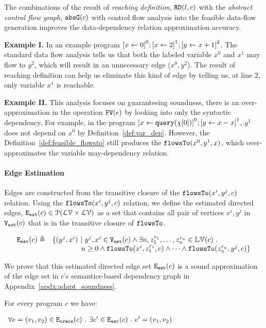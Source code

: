 The combinations of the result of \emph{reaching definition}, $\mathtt{RD}(l, c)$
with the \emph{abstract control flow graph}, $\mathtt{abs}{\mathtt{G}}(c)$ with control flow analysis into the feasible 
data-flow generation improves the data-dependency relation approximation accuracy. 

\textbf{Example I.}
In an example program $\clabel{\assign{x}{0}}^{0}; \clabel{\assign{x}{2}}^{1}; \clabel{\assign{y}{x + 1}}^{2}$. 
The standard data flow analysis 
tells us that both the labeled variable $x^{0}$ and $x^1$ may flow to $y^{2}$, which will result in an unnecessary edge ($x^{0}, y^{2}$). The result of reaching definition 
can help us eliminate this kind of edge by telling us, at line $2$, only variable $x^{1}$ is reachable. 

\textbf{Example II.}
This analysis focuses on guaranteeing soundness,
there is an over-approximation in the operation $\mathtt{FV}(e)$ by looking into only the syntactic dependency.
For example, in the program 
$\clabel{\assign{x}{\query(\chi[0])}}^{0}; \clabel{\assign{y}{x - x}}^{1}$,
$y^1$ does not depend on $x^0$ by Definition~\ref{def:var_dep}.
However, the Definition~\ref{def:feasible_flowsto} still produces the $\mathtt{flowsTo}(x^0, y^1, x)$, which over-approximates the variable may-dependency relation.

\paragraph{Edge Estimation}
Edges are constructed from the transitive closure of
the $\mathtt{flowsTo}(x^i, y^j, c)$ relation.
Using the $\mathtt{flowsTo}(x^i, y^j, c)$ relation, we define the estimated directed edges, 
$\mathtt{{E_{est}}}(c) \in \mathcal{P}( \mathcal{LV} \times \mathcal{LV})$ as a set that contains all
pair of vertices $x^i, y^j$ in $\mathtt{{V_{est}}}(c)$ that is in the transitive closure of $\mathtt{flowsTo}$.

\[
 \begin{array}{ll}
 \mathtt{{E_{est}}}(c) \triangleq &
 \{ 
 (y^j, x^i) ~ \vert ~ y^j, x^i \in \mathtt{{V_{est}}}(c)
 \land
 \exists n,
 z_1^{r_1}, \ldots, z_n^{r_n} \in \mathbb{LV}(c) ~.~ 
 \\ & \qquad \qquad
 n \geq 0 \land \mathtt{flowsTo}(x^i, z_1^{r_1}, c) 
 \land \cdots \land \mathtt{flowsTo}(z_n^{r_n}, y^j, c) 
 \}
 \end{array}
 \]

 We prove that this estimated directed edge set $\mathtt{{E_{est}}}(c)$ is a sound approximation of the 
edge set in $c$'s semantics-based dependency graph 
in Appendix~\ref{apdx:adapt_soundness}.
\begin{lem}
 For every program $c$ we have:
 \begin{center}
$
 \begin{array}{l}
 \forall e = (v_1, v_2) \in \mathtt{{E_{trace}}}(c)
 ~.~ 
 \exists e' \in \mathtt{{E_{est}}}(c) ~.~ e' = (v_1, v_2)
 \end{array}
$
\end{center} 
\end{lem}

